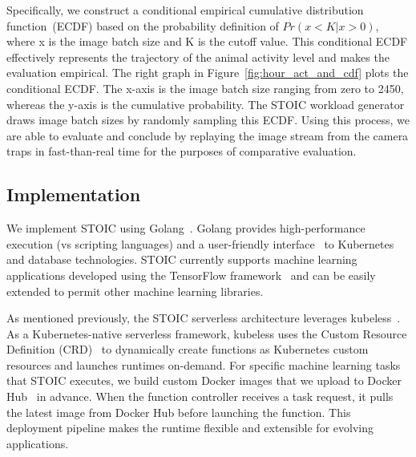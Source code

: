 Specifically, we construct a conditional empirical cumulative distribution function~(ECDF) based on the probability definition of  $Pr(x < K | x > 0)$, where x is the image batch size and K is the cutoff value. This conditional ECDF effectively represents the trajectory of the animal activity level and makes the evaluation empirical. The right graph in Figure~\ref{fig:hour_act_and_cdf} plots the conditional ECDF. 
The x-axis is the image batch size ranging from zero to 2450, whereas the y-axis is the cumulative probability. The STOIC workload generator draws image batch sizes by
randomly sampling this ECDF.
Using this process, we are able to evaluate and conclude by replaying the image stream from the camera traps in fast-than-real time for the purposes of comparative evaluation.




 \subsection{Implementation}

We implement STOIC using Golang~\cite{ref:golang}. Golang provides high-performance execution (vs scripting languages) and a user-friendly interface~\cite{ref:client-go} to Kubernetes and database technologies. STOIC currently supports machine learning applications developed using the TensorFlow framework~\cite{ref:tensorflow} and can be easily extended to permit other machine learning libraries.
 
As mentioned previously, the STOIC serverless architecture leverages kubeless~\cite{ref:kubeless}. As a Kubernetes-native serverless framework, kubeless uses the Custom Resource Definition (CRD)~\cite{ref:crd} to dynamically create functions as Kubernetes custom resources and launches runtimes on-demand. For specific machine learning tasks that STOIC executes, we build custom Docker images that we upload to Docker Hub~\cite{ref:dockerhub} in advance. When the function controller receives a task request, it pulls the latest image from Docker Hub before launching the function. This deployment pipeline makes the runtime flexible and extensible for evolving applications. 

